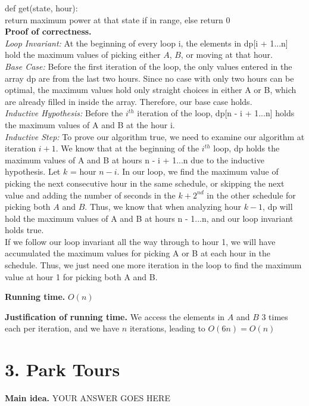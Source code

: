\documentclass[11pt]{article}
\begin{document}
\noindent def get(state, hour): \\
\indent return maximum power at that state if in range, else return 0 \\
\noindent
\textbf{Proof of correctness.}\\
\textit{Loop Invariant:} At the beginning of every loop i, the elements in dp[i + 1...n] hold the maximum values of picking either $A$, $B$, or moving at that hour.  \\
\textit{Base Case:} Before the first iteration of the loop, the only values entered in the array dp are from the last two hours.  Since no case with only two hours can be optimal, the maximum values hold only straight choices in either A or B, which are already filled in inside the array.  Therefore, our base case holds. \\
\textit{Inductive Hypothesis:} Before the $i^{th}$ iteration of the loop, dp[n - i + 1...n] holds the maximum values of A and B at the hour i. \\
\textit{Inductive Step:} To prove our algorithm true, we need to examine our algorithm at iteration $i + 1$.  We know that at the beginning of the $i^{th}$ loop, dp holds the maximum values of A and B at hours n - i + 1...n due to the inductive hypothesis.  Let $k$ = hour $n - i$.  In our loop, we find the maximum value of picking the next consecutive hour in the same schedule, or skipping the next value and adding the number of seconds in the $k+2^{nd}$ in the other schedule for picking both $A$ and $B$.  Thus, we know that when analyzing hour $k - 1$, dp will hold the maximum values of A and B at hours n - 1...n, and our loop invariant holds true. \\

\noindent If we follow our loop invariant all the way through to hour 1, we will have accumulated the maximum values for picking A or B at each hour in the schedule.  Thus, we just need one more iteration in the loop to find the maximum value at hour 1 for picking both A and B.

\noindent
\textbf{Running time.}
$O(n)$


\noindent
\textbf{Justification of running time.}
We access the elements in $A$ and $B$ 3 times each per iteration, and we have $n$ iterations, leading to $O(6n) = O(n)$



\newpage
\section*{3. Park Tours}
\noindent
\textbf{Main idea.}
YOUR ANSWER GOES HERE
\end{document}
